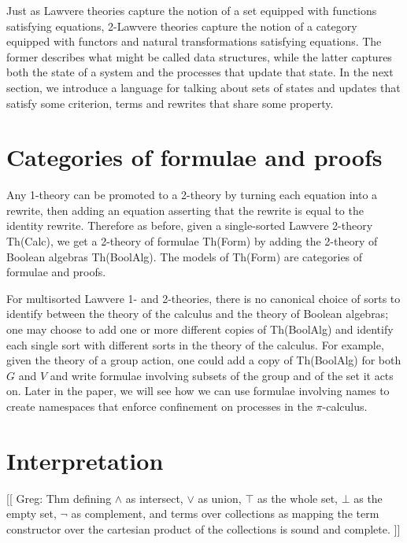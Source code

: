 \documentclass{llncs}
\begin{document}
Just as Lawvere theories capture the notion of a set equipped with functions satisfying equations, 2-Lawvere theories capture the notion of a category equipped with functors and natural transformations satisfying equations.  The former describes what might be called data structures, while the latter captures both the state of a system and the processes that update that state.  In the next section, we introduce a language for talking about sets of states and updates that satisfy some criterion, terms and rewrites that share some property.

\section{Categories of formulae and proofs}

Any 1-theory can be promoted to a 2-theory by turning each equation into a rewrite, then adding an equation asserting that the rewrite is equal to the identity rewrite.  Therefore as before, given a single-sorted Lawvere 2-theory Th(Calc), we get a 2-theory of formulae Th(Form) by adding the 2-theory of Boolean algebras Th(BoolAlg).  The models of Th(Form) are categories of formulae and proofs.

For multisorted Lawvere 1- and 2-theories, there is no canonical choice of sorts to identify between the theory of the calculus and the theory of Boolean algebras; one may choose to add one or more different copies of Th(BoolAlg) and identify each single sort with different sorts in the theory of the calculus.  For example, given the theory of a group action, one could add a copy of Th(BoolAlg) for both $G$ and $V$ and write formulae involving subsets of the group and of the set it acts on.  Later in the paper, we will see how we can use formulae involving names to create namespaces that enforce confinement on processes in the $\pi$-calculus.

\section{Interpretation}

[[ Greg: Thm defining $\land$ as intersect, $\lor$ as union, $\top$ as
    the whole set, $\bot$ as the empty set, $\neg$ as complement, and
    terms over collections as mapping the term constructor over the
    cartesian product of the collections is sound and complete. ]]
\end{document}
